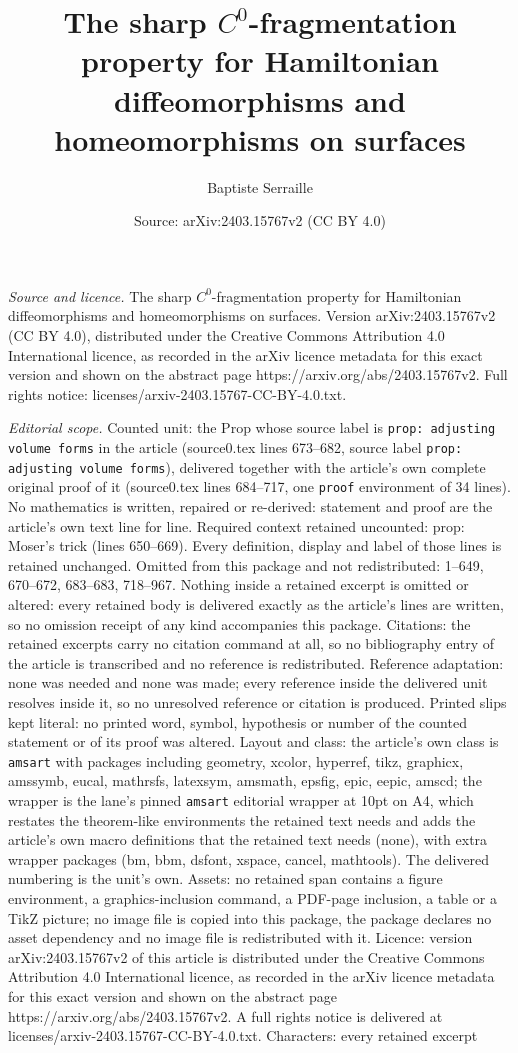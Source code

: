 \documentclass[10pt,a4paper]{amsart}
\title[The sharp $C^0$-fragmentation property for Hamiltonian diffe]{The sharp $C^0$-fragmentation property for Hamiltonian diffeomorphisms and homeomorphisms on surfaces}
\author{Baptiste Serraille}
\date{Source: arXiv:2403.15767v2 (CC BY 4.0)}
\begin{document}
\maketitle

\noindent\emph{Source and licence.} The sharp $C^0$-fragmentation property for Hamiltonian diffeomorphisms and homeomorphisms on surfaces. Version arXiv:2403.15767v2 (CC BY 4.0), distributed under the Creative Commons Attribution 4.0 International licence, as recorded in the arXiv licence metadata for this exact version and shown on the abstract page https://arxiv.org/abs/2403.15767v2. Full rights notice: licenses/arxiv-2403.15767-CC-BY-4.0.txt.\par\smallskip

\noindent\textit{Editorial scope.} Counted unit: the Prop whose source label is \texttt{prop: adjusting volume forms} in the article (source0.tex lines 673--682, source label \texttt{prop: adjusting volume forms}), delivered together with the article's own complete original proof of it (source0.tex lines 684--717, one \texttt{proof} environment of 34 lines). No mathematics is written, repaired or re-derived: statement and proof are the article's own text line for line. Required context retained uncounted: prop: Moser's trick (lines 650--669). Every definition, display and label of those lines is retained unchanged. Omitted from this package and not redistributed: 1--649, 670--672, 683--683, 718--967. Nothing inside a retained excerpt is omitted or altered: every retained body is delivered exactly as the article's lines are written, so no omission receipt of any kind accompanies this package. Citations: the retained excerpts carry no citation command at all, so no bibliography entry of the article is transcribed and no reference is redistributed. Reference adaptation: none was needed and none was made; every reference inside the delivered unit resolves inside it, so no unresolved reference or citation is produced. Printed slips kept literal: no printed word, symbol, hypothesis or number of the counted statement or of its proof was altered. Layout and class: the article's own class is \texttt{amsart} with packages including geometry, xcolor, hyperref, tikz, graphicx, amssymb, eucal, mathrsfs, latexsym, amsmath, epsfig, epic, eepic, amscd; the wrapper is the lane's pinned \texttt{amsart} editorial wrapper at 10pt on A4, which restates the theorem-like environments the retained text needs and adds the article's own macro definitions that the retained text needs (none), with extra wrapper packages (bm, bbm, dsfont, xspace, cancel, mathtools). The delivered numbering is the unit's own. Assets: no retained span contains a figure environment, a graphics-inclusion command, a PDF-page inclusion, a table or a TikZ picture; no image file is copied into this package, the package declares no asset dependency and no image file is redistributed with it. Licence: version arXiv:2403.15767v2 of this article is distributed under the Creative Commons Attribution 4.0 International licence, as recorded in the arXiv licence metadata for this exact version and shown on the abstract page https://arxiv.org/abs/2403.15767v2. A full rights notice is delivered at licenses/arxiv-2403.15767-CC-BY-4.0.txt. Characters: every retained excerpt 
\end{document}
